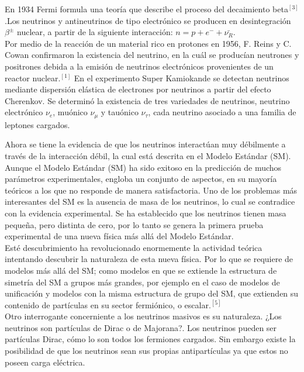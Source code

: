 \documentclass[12pt]{article}
\begin{document}
 En 1934 Fermi formula una teoría que describe el proceso del decaimiento beta$^{[3]}$.Los neutrinos y antineutrinos de tipo electrónico se producen en desintegración $\beta^{\pm}$ nuclear, a partir de la siguiente interacción: $n = p + e^- + \bar{\nu_R}$. \\

 Por medio de la reacción de un material rico en protones en 1956, F. Reins y C. Cowan  confirmaron la existencia del neutrino, en la cuál se producían neutrones y positrones debida a la emisión de neutrinos electrónicos provenientes de un reactor nuclear.$^{[1]}$
 En el experimento Super Kamiokande se detectan neutrinos mediante dispersión elástica de electrones por neutrinos a partir del efecto Cherenkov. Se determinó la existencia de tres variedades de neutrinos, neutrino electrónico $\nu_e$, muónico  $\nu_\mu$ y tauónico $\nu_\tau$, cada neutrino asociado a una familia de leptones cargados.

Ahora se tiene la evidencia de que los neutrinos interactúan muy débilmente a través de la interacción débil, la cual está descrita en el Modelo Estándar (SM).  Aunque el Modelo Estándar (SM) ha sido exitoso en la predicción de muchos parámetros experimentales, engloba un conjunto de aspectos, en su mayoría teóricos a los que no responde de manera satisfactoria. Uno de los problemas más interesantes del SM es la ausencia de masa de los neutrinos, lo cual se contradice con la evidencia experimental. Se ha establecido que los neutrinos tienen masa pequeña, pero distinta de cero, por lo tanto se genera la primera prueba experimental de una nueva física más allá del Modelo Estándar.\\ 
 
 Esté descubrimiento ha revolucionado enormemente la actividad teórica intentando descubrir la naturaleza de esta nueva física. Por lo que se requiere de modelos más allá del SM; como modelos en que se extiende la estructura de simetría del SM a grupos más grandes, por ejemplo en el caso de modelos de unificación y modelos con la misma estructura de grupo del SM, que extienden su contenido de partículas en su sector fermiónico, o escalar.$^{[5]}$ \\

Otro interrogante concerniente a los neutrinos masivos es su naturaleza. ¿Los neutrinos son partículas de Dirac o de Majorana?. Los neutrinos pueden ser partículas Dirac, cómo lo son todos los fermiones cargados. Sin embargo existe la posibilidad de que los neutrinos sean sus propias antipartículas ya que estos no poseen carga eléctrica.  \\
\end{document}
